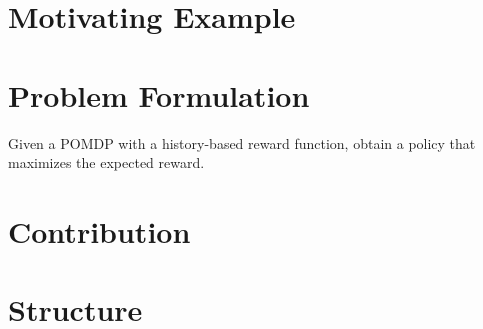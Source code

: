 \par
\section*{Motivating Example}

\section*{Problem Formulation}
Given a POMDP with a history-based reward function, obtain a policy that maximizes the expected reward.

\section*{Contribution}

\section*{Structure}